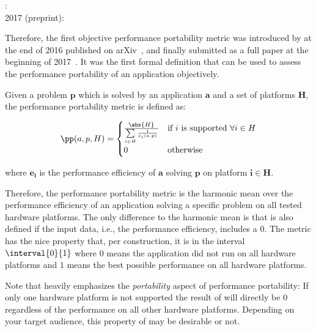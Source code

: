 










: \citet{pennycook_metric_2016}\\
2017 (preprint): \citet{pennycook_implications_2019}

Therefore, the first objective performance portability metric was introduced by \citeauthor{pennycook_implications_2019} at the end of 2016 published on arXiv~\cite{pennycook_metric_2016}, and finally submitted as a full paper at the beginning of 2017~\cite{pennycook_implications_2019}. 
It was the first formal definition that can be used to assess the performance portability of an application objectively.

\begin{definition}\label{def:pp}
    Given a problem $\mathbf{p}$ which is solved by an application $\mathbf{a}$ and a set of platforms $\mathbf{H}$, the performance portability metric \pp is defined as:

    \[ \pp(a, p, H) = 
        \begin{cases}
            \frac{\abs{H}}{\sum\limits_{i \in H} \frac{1}{e_i(a, p)}} & \text{if }i\text{ is supported } \forall i \in H \\
            0                                                         & \text{otherwise}
        \end{cases} 
    \]

    where $\mathbf{e_i}$ is the performance efficiency of $\mathbf{a}$ solving $\mathbf{p}$ on platform $\mathbf{i \in H}$.
\end{definition}

Therefore, the performance portability metric \pp is the harmonic mean over the performance efficiency of an application solving a specific problem on all tested hardware platforms. 
The only difference to the harmonic mean is that \pp is also defined if the input data, i.e., the performance efficiency, includes a $0$. 
The \pp metric has the nice property that, per construction, it is in the interval $\interval{0}{1}$ where $0$ means the application did not run on all hardware platforms and $1$ means the best possible performance on all hardware platforms. 

Note that \pp heavily emphasizes the \textit{portability} aspect of performance portability: If only one hardware platform is not supported the result of \pp will directly be $0$ regardless of the performance on all other hardware platforms. 
Depending on your target audience, this property of \pp may be desirable or not. 


